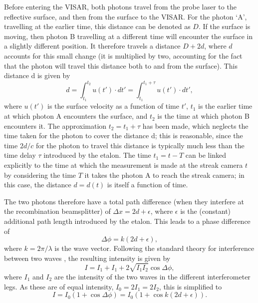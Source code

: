 Before entering the VISAR, both photons travel from the probe laser to the reflective surface, and then from the surface to the VISAR. For the photon `A', travelling at the earlier time, this distance can be denoted as $D$. If the surface is moving, then photon B travelling at a different time will encounter the surface in a slightly different position. It therefore travels a distance $D+2d$, where $d$ accounts for this small change (it is multiplied by two, accounting for the fact that the photon will travel this distance both to and from the surface). This distance d is given by \begin{equation} d = \int_{t_1}^{t_2} u(t') \cdot dt' = \int_{t_1}^{t_1 + \tau} u(t') \cdot dt',\end{equation} where $u(t')$ is the surface velocity as a function of time $t'$, $t_1$ is the earlier time at which photon A encounters the surface, and $t_2$ is the time at which photon B encounters it. The approximation $t_2 = t_1 + \tau$ has been made, which neglects the time taken for the photon to cover the distance d; this is reasonable, since the time $2d/c$ for the photon to travel this distance is typically much less than the time delay $\tau$ introduced by the etalon. The time $t_1 = t - T$ can be linked explicitly to the time at which the measurement is made at the streak camera $t$ by considering the time $T$ it takes the photon A to reach the streak camera; in this case, the distance $d = d(t)$ is itself a function of time.

The two photons therefore have a total path difference (when they interfere at the recombination beamsplitter) of $ \Delta x = 2d + \epsilon $, where $\epsilon$ is the (constant) additional path length introduced by the etalon. This leads to a phase difference of \begin{equation} \Delta\phi = k (2d + \epsilon),\end{equation} where $k = 2\pi / \lambda$ is the wave vector. Following the standard theory for interference between two waves \cite{Hecht2017}, the resulting intensity is given by  \begin{equation}I = I_1 + I_1 + 2\sqrt{I_1 I_2} \cos{\Delta \phi},\end{equation} where $I_1$ and $I_2$ are the intensity of the two waves in the different interferometer legs. As these are of equal intensity, $I_0 = 2 I_1 = 2 I_2$, this is simplified to \begin{equation} I = I_0 (1 + \cos{\Delta \phi}) = I_0 (1 + \cos{k (2d + \epsilon)}).\end{equation}

